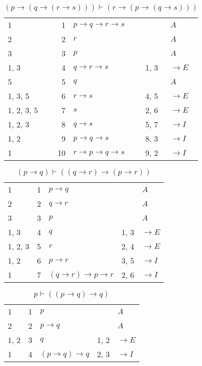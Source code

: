 \documentclass{article}
\begin{document}
\begin{table}[htbp]\caption*{$(p → (q → (r → s))) ⊢ (r → (p → (q → s)))$}\centering\begin{tabular}{lrlll}
{1} & 1 & $p→q→r→s$ & {} & $A$ \\
{2} & 2 & $r$ & {} & $A$ \\
{3} & 3 & $p$ & {} & $A$ \\
{1, 3} & 4 & $q→r→s$ & {1, 3} & $→E$ \\
{5} & 5 & $q$ & {} & $A$ \\
{1, 3, 5} & 6 & $r→s$ & {4, 5} & $→E$ \\
{1, 2, 3, 5} & 7 & $s$ & {2, 6} & $→E$ \\
{1, 2, 3} & 8 & $q→s$ & {5, 7} & $→I$ \\
{1, 2} & 9 & $p→q→s$ & {8, 3} & $→I$ \\
{1} & 10 & $r→p→q→s$ & {9, 2} & $→I$ \\
\end{tabular}
\end{table}
\begin{table}[htbp]\caption*{$(p → q) ⊢ ((q → r) → (p → r))$}\centering\begin{tabular}{lrlll}
{1} & 1 & $p→q$ & {} & $A$ \\
{2} & 2 & $q→r$ & {} & $A$ \\
{3} & 3 & $p$ & {} & $A$ \\
{1, 3} & 4 & $q$ & {1, 3} & $→E$ \\
{1, 2, 3} & 5 & $r$ & {2, 4} & $→E$ \\
{1, 2} & 6 & $p→r$ & {3, 5} & $→I$ \\
{1} & 7 & $(q→r)→p→r$ & {2, 6} & $→I$ \\
\end{tabular}
\end{table}
\begin{table}[htbp]\caption*{$p ⊢ ((p → q) → q)$}\centering\begin{tabular}{lrlll}
{1} & 1 & $p$ & {} & $A$ \\
{2} & 2 & $p→q$ & {} & $A$ \\
{1, 2} & 3 & $q$ & {1, 2} & $→E$ \\
{1} & 4 & $(p→q)→q$ & {2, 3} & $→I$ \\
\end{tabular}
\end{table}
\end{document}
